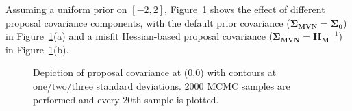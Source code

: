 Assuming a uniform prior on $[-2,2]$,
Figure~\ref{fig:rosen_prop_covar} shows the effect of different
proposal covariance components, with the default prior covariance 
($\boldsymbol{\Sigma_{MVN}} = \boldsymbol{\Sigma_0}$) in
Figure~\ref{fig:rosen_prop_covar}(a) and a misfit Hessian-based
proposal covariance ($\boldsymbol{\Sigma_{MVN}} = \boldsymbol{H_M}^{-1}$) 
in Figure~\ref{fig:rosen_prop_covar}(b).
\begin{figure}[htbp]
  \begin{subfigmatrix}{2}
  \end{subfigmatrix}
  \caption{Depiction of proposal covariance at (0,0) with contours at one/two/three standard deviations.  2000 MCMC samples are performed and every 20th sample is plotted.}
\label{fig:rosen_prop_covar}
\end{figure}
